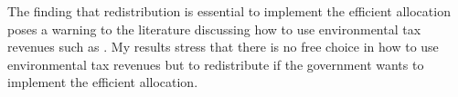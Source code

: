 

The finding that redistribution is essential to implement the efficient allocation poses a warning to the literature discussing how to use environmental tax revenues such as \cite{Fried2018TheGenerations}. My results stress that there is no free choice in how to use environmental tax revenues but to redistribute if the government wants to implement the efficient allocation. 